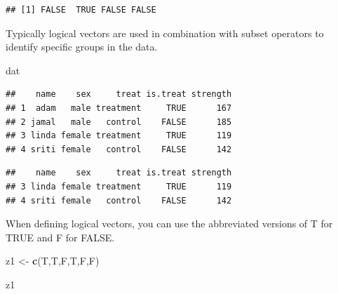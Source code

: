 \documentclass[]{book}
\newenvironment{Shaded}{\begin{snugshade}}{\end{snugshade}}
\newcommand{\CommentTok}[1]{\textcolor[rgb]{0.56,0.35,0.01}{\textit{#1}}}
\newcommand{\DecValTok}[1]{\textcolor[rgb]{0.00,0.00,0.81}{#1}}
\newcommand{\KeywordTok}[1]{\textcolor[rgb]{0.13,0.29,0.53}{\textbf{#1}}}
\newcommand{\NormalTok}[1]{#1}
\newcommand{\OperatorTok}[1]{\textcolor[rgb]{0.81,0.36,0.00}{\textbf{#1}}}
\newcommand{\StringTok}[1]{\textcolor[rgb]{0.31,0.60,0.02}{#1}}
\theoremstyle{definition}
\theoremstyle{definition}
\theoremstyle{definition}
\theoremstyle{remark}
\begin{document}
\begin{Shaded}
\end{Shaded}

\begin{verbatim}
## [1] FALSE  TRUE FALSE FALSE
\end{verbatim}

Typically logical vectors are used in combination with subset operators
to identify specific groups in the data.

\begin{Shaded}
\begin{Highlighting}[]
\NormalTok{dat}
\end{Highlighting}
\end{Shaded}

\begin{verbatim}
##    name    sex     treat is.treat strength
## 1  adam   male treatment     TRUE      167
## 2 jamal   male   control    FALSE      185
## 3 linda female treatment     TRUE      119
## 4 sriti female   control    FALSE      142
\end{verbatim}

\begin{Shaded}
\end{Shaded}

\begin{verbatim}
##    name    sex     treat is.treat strength
## 3 linda female treatment     TRUE      119
## 4 sriti female   control    FALSE      142
\end{verbatim}

When defining logical vectors, you can use the abbreviated versions of T
for TRUE and F for FALSE.

\begin{Shaded}
\begin{Highlighting}[]
\NormalTok{z1 <-}\StringTok{ }\KeywordTok{c}\NormalTok{(T,T,F,T,F,F)}

\NormalTok{z1}
\end{Highlighting}
\end{Shaded}
\end{document}

